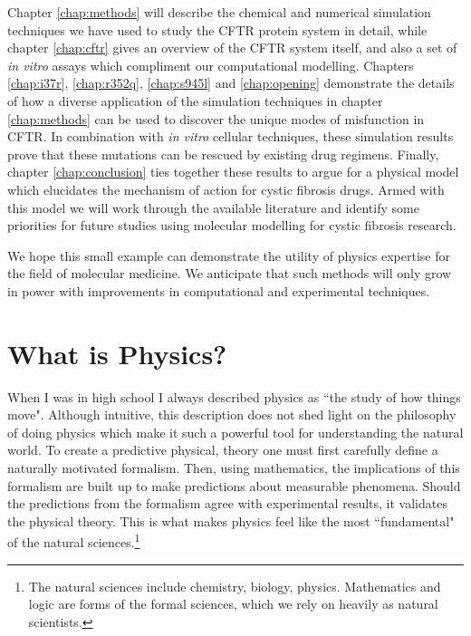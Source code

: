 Chapter \ref{chap:methods} will describe the chemical and numerical simulation techniques we have used to study the CFTR protein system in detail, while chapter \ref{chap:cftr} gives an overview of the CFTR system itself, and also a set of \textit {in vitro} assays which compliment our computational modelling.  Chapters \ref{chap:i37r}, \ref{chap:r352q}, \ref{chap:s945l} and \ref{chap:opening} demonstrate the details of how a diverse application of the simulation techniques in chapter \ref{chap:methods} can be used to discover the unique modes of misfunction in CFTR. In combination with \textit {in vitro} cellular techniques, these simulation results prove that these mutations can be rescued by existing drug regimens. Finally, chapter \ref{chap:conclusion} ties together these results to argue for a physical model which elucidates the mechanism of action for cystic fibrosis drugs. Armed with this model we will work through the available literature and identify some priorities for future studies using molecular modelling for cystic fibrosis research.

We hope this small example can demonstrate the utility of physics expertise for the field of molecular medicine. We anticipate that such methods will only grow in power with improvements in computational and experimental techniques.

\section{What is Physics?}
\label{WIP}
When I was in high school I always described physics as ``the study of how things move". Although intuitive, this description does not shed light on the philosophy of doing physics which make it such a powerful tool for understanding the natural world. To create a predictive physical, theory one must first carefully define a naturally motivated formalism. Then, using mathematics, the implications of this formalism are built up to make predictions about measurable phenomena. Should the predictions from the formalism agree with experimental results, it validates the physical theory. This is what makes physics feel like the most ``fundamental" of the natural sciences.\footnote{The natural sciences include chemistry, biology, physics.  Mathematics and logic are forms of the formal sciences, which we rely on heavily as natural scientists. }

